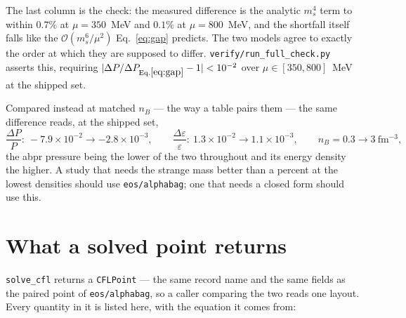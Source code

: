 \documentclass[aps,prc,onecolumn,superscriptaddress,nofootinbib,10pt]{revtex4-2}
\newcommand{\nB}{n_B}
\newcommand{\ms}{m_s}
\begin{document}
\noindent
The last column is the check: the measured difference is the analytic
$\ms^4$ term to within $0.7\%$ at $\mu = 350$~MeV and $0.1\%$ at
$\mu = 800$~MeV, and the shortfall itself falls like the
$\mathcal{O}(\ms^6/\mu^2)$ Eq.~\eqref{eq:gap} predicts. The two models agree
to exactly the order at which they are supposed to differ.
\texttt{verify/run\_full\_check.py} asserts this, requiring
$|\Delta P/\Delta P_{\rm Eq.\eqref{eq:gap}} - 1| < 10^{-2}$ over
$\mu \in [350, 800]$~MeV at the shipped set.

Compared instead at matched $\nB$ --- the way a table pairs them --- the
same difference reads, at the shipped set,
%
\begin{equation}
\frac{\Delta P}{P} : \ -7.9\times10^{-2} \to -2.8\times10^{-3} , \qquad
\frac{\Delta \varepsilon}{\varepsilon} : \
1.3\times10^{-2} \to 1.1\times10^{-3} ,
\qquad \nB = 0.3 \to 3\ \mathrm{fm^{-3}} ,
\nonumber
\end{equation}
%
the abpr pressure being the lower of the two throughout and its energy density
the higher. A study that needs the strange mass better than a percent at the
lowest densities should use \texttt{eos/alphabag}; one that needs a closed
form should use this.

\section{What a solved point returns}
\label{sec:returns}

\texttt{solve\_cfl} returns a \texttt{CFLPoint} --- the same record name and
the same fields as the paired point of \texttt{eos/alphabag}, so a caller
comparing the two reads one layout. Every quantity in it is listed here, with
the equation it comes from:
\end{document}
